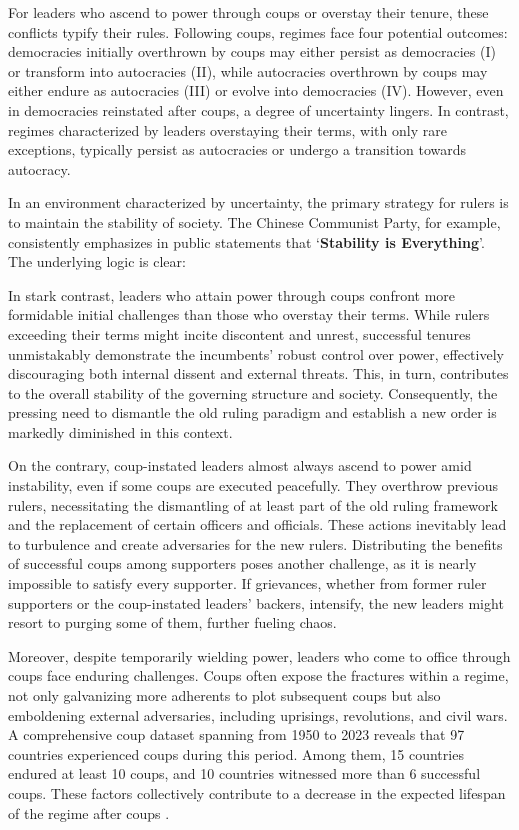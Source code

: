 \documentclass[
  12pt,
  a4paper,
  12pt]{article}
\begin{document}
For leaders who ascend to power through coups or overstay their tenure,
these conflicts typify their rules. Following coups, regimes face four
potential outcomes: democracies initially overthrown by coups may either
persist as democracies (I) or transform into autocracies (II), while
autocracies overthrown by coups may either endure as autocracies (III)
or evolve into democracies (IV). However, even in democracies reinstated
after coups, a degree of uncertainty lingers. In contrast, regimes
characterized by leaders overstaying their terms, with only rare
exceptions, typically persist as autocracies or undergo a transition
towards autocracy.

In an environment characterized by uncertainty, the primary strategy for
rulers is to maintain the stability of society. The Chinese Communist
Party, for example, consistently emphasizes in public statements that
`\textbf{Stability is Everything}'. The underlying logic is clear:

In stark contrast, leaders who attain power through coups confront more
formidable initial challenges than those who overstay their terms. While
rulers exceeding their terms might incite discontent and unrest,
successful tenures unmistakably demonstrate the incumbents' robust
control over power, effectively discouraging both internal dissent and
external threats. This, in turn, contributes to the overall stability of
the governing structure and society. Consequently, the pressing need to
dismantle the old ruling paradigm and establish a new order is markedly
diminished in this context.

On the contrary, coup-instated leaders almost always ascend to power
amid instability, even if some coups are executed peacefully. They
overthrow previous rulers, necessitating the dismantling of at least
part of the old ruling framework and the replacement of certain officers
and officials. These actions inevitably lead to turbulence and create
adversaries for the new rulers. Distributing the benefits of successful
coups among supporters poses another challenge, as it is nearly
impossible to satisfy every supporter. If grievances, whether from
former ruler supporters or the coup-instated leaders' backers,
intensify, the new leaders might resort to purging some of them, further
fueling chaos.

Moreover, despite temporarily wielding power, leaders who come to office
through coups face enduring challenges. Coups often expose the fractures
within a regime, not only galvanizing more adherents to plot subsequent
coups but also emboldening external adversaries, including uprisings,
revolutions, and civil wars. A comprehensive coup dataset
\citep{powell2011} spanning from 1950 to 2023 reveals that 97 countries
experienced coups during this period. Among them, 15 countries endured
at least 10 coups, and 10 countries witnessed more than 6 successful
coups. These factors collectively contribute to a decrease in the
expected lifespan of the regime after coups \citep{dahl2023}.
\end{document}
